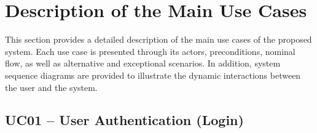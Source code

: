 \section{Description of the Main Use Cases}

This section provides a detailed description of the main use cases of the proposed system. Each use case is presented through its actors, preconditions, nominal flow, as well as alternative and exceptional scenarios. In addition, system sequence diagrams are provided to illustrate the dynamic interactions between the user and the system.


\subsection{UC01 -- User Authentication (Login)}

